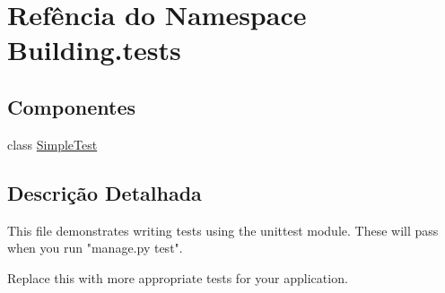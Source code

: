 \hypertarget{namespaceBuilding_1_1tests}{\section{Refência do Namespace Building.\-tests}
\label{dc/d30/namespaceBuilding_1_1tests}
}
\subsection*{Componentes}
\begin{DoxyCompactItemize}
\item 
class \hyperlink{classBuilding_1_1tests_1_1SimpleTest}{Simple\-Test}
\end{DoxyCompactItemize}


\subsection{Descrição Detalhada}
\begin{DoxyVerb}This file demonstrates writing tests using the unittest module. These will pass
when you run "manage.py test".

Replace this with more appropriate tests for your application.
\end{DoxyVerb}
 